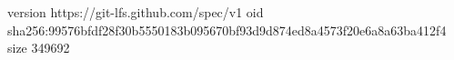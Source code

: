 version https://git-lfs.github.com/spec/v1
oid sha256:99576bfdf28f30b5550183b095670bf93d9d874ed8a4573f20e6a8a63ba412f4
size 349692
